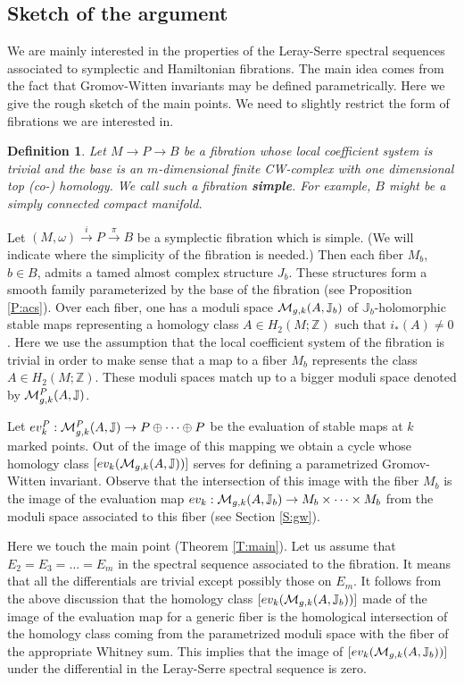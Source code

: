 \documentclass[a4paper,14pt]{article}
\newcommand{\B}[1]{\mathbb #1}
\newcommand{\C}[1]{{\cal #1}}
\newcommand{\map}[1]{\stackrel {#1}\longrightarrow}
\newcommand{\Mo}{(M,\omega )}
\newcommand{\sfib}{\Mo \map{i} P\map{\pi } B}
\newtheorem{defin}[theorem]{Definition}
\numberwithin{equation}{section}
\begin{document}
\subsection{Sketch of the argument}

We are mainly interested in the properties of
the Leray-Serre spectral sequences associated to symplectic
and Hamiltonian fibrations. The main idea comes from the
fact that Gromov-Witten invariants may be defined parametrically.
Here we give the rough sketch of the main points. We need to
slightly restrict the form of fibrations we are interested in.


\begin{defin}\label{D:simple}
Let $M \to P \to B$ be a  fibration whose local coefficient
system is trivial and the base is an $m$-dimensional finite CW-complex
with one dimensional top (co-) homology. 
We call such a fibration {\bf simple}. For example,
$B$ might be a simply connected compact manifold.
\end{defin}


Let $\sfib $ be a symplectic fibration which is simple.
(We will indicate where the simplicity of the fibration is
needed.)
Then 
each fiber $M_b$, $b\in B$, admits a tamed almost 
complex structure $J_b$. These
structures form a smooth family parameterized by the base
of the fibration (see Proposition \ref{P:acs}).
Over each fiber, one has a moduli space 
$\C M_{g,k}(A,\B J_b)$
of 
$\B J_b$-holomorphic stable maps representing a homology
class $A\in H_2(M;\B Z)$ such that $i_*(A)\neq 0$.
Here we use the assumption that the local 
coefficient system of the fibration is trivial
in order to make sense that a map to a fiber $M_b$
represents the class $A\in H_2(M;\B Z)$.
These moduli spaces match up to a bigger moduli space denoted
by $\C M^P_{g,k}(A,\B J)$.




Let $ev_k^P:\C M_{g,k}^P(A, \B J)\to P\oplus \dots \oplus P$
be the evaluation of stable maps at $k$ marked points.
Out of the image of
this mapping we obtain a cycle whose homology class
$[ev_k(\C M_{g,k}(A, \B J))]$
serves for defining a parametrized Gromov-Witten invariant.
Observe that the intersection of this image with
the fiber $M_b$ is the image of the evaluation map
$ev_k:\C M_{g,k}(A, \B J_b)\to M_b\times \dots \times M_b$
from the moduli space associated to this fiber
(see Section \ref{S:gw}).




Here we touch the main point (Theorem \ref{T:main}).
Let us assume that $E_2=E_3=\dots =E_m$ in the spectral
sequence associated to the fibration. It means that
all the differentials are trivial except possibly those
on $E_m$. 
It follows from
the above discussion that the homology class 
$[ev_k(\C M_{g,k}(A,\B J_b))]$
made of the image of the evaluation map for
a generic fiber is the homological intersection
of the homology class coming from the parametrized
moduli space with the fiber of the appropriate
Whitney sum. This implies that the image of
$[ev_k(\C M_{g,k}(A,\B J_b))]$ 
under the differential in the Leray-Serre
spectral sequence is zero. 
\end{document}
